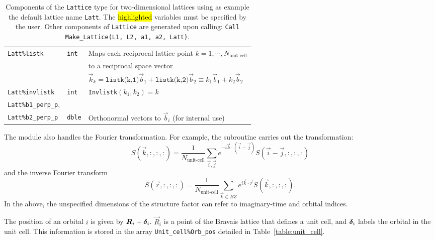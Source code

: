 \begin{table}[h!]
\begin{center}
\begin{tabular}{@{} l l @{$\;\;$} l @{}}
    \texttt{Latt\%listk}                               & \texttt{int}   &  Maps each reciprocal lattice point $k=1,\cdots, N_{\text{unit-cell}}$\\
                                                                   &    & to a reciprocal space vector\\
                                                                   &    & $\vec{k}_k= \texttt{listk(k,1)} \vec{b}_1 +  \texttt{listk(k,2)} \vec{b}_2  \equiv k_1  \vec{b}_1 +   k_2  \vec{b}_2 $ \\
    \texttt{Latt\%invlistk}                            & \texttt{int}   &   \texttt{Invlistk}$(k_1,k_2) = k $ \\
   \texttt{Latt\%b1\_perp\_p},                         &                & \\ 
   \texttt{Latt\%b2\_perp\_p}                          & \texttt{dble}  &  Orthonormal vectors to $\vec{b}_i$ (for internal use) \\\bottomrule
   \end{tabular}
   \caption{Components of the \texttt{Lattice} type for two-dimensional lattices using as example the default lattice name \texttt{Latt}.
   The \hl{highlighted} variables must be specified by the user.  Other components of \texttt{Lattice} are generated upon calling: \texttt{Call Make\_Lattice(L1, L2, a1, a2, Latt)}. 
    \label{table:lattice}}
\end{center}
\end{table}
%

The  module also handles the Fourier transformation.  For example,  the  subroutine     carries out the  transformation: 
\begin{equation}
	S(\vec{k}, :,:,:) =  \frac{1}{N_\text{unit-cell}}  \sum_{\vec{i},\vec{j}}   e^{-i \vec{k} \cdot \left( \vec{i}-\vec{j} \right)} S(\vec{i}  - \vec{j}, :,:,:)
\end{equation}
and    the  inverse Fourier transform 
 \begin{equation}
	S(\vec{r}, :,:,:) =  \frac{1}{N_\text{unit-cell}}  \sum_{\vec{k} \in BZ }   e^{ i \vec{k} \cdot \vec{r}} S(\vec{k}, :,:,:).
\end{equation}
In the above,   the unspecified dimensions of  the structure factor can refer  to imaginary-time  and orbital indices. 

The position of an orbital  $i$  is given by   $\boldsymbol{R}_i +   \boldsymbol{\delta}_i $.   $\vec{R}_i $ is a point of the Bravais lattice that defines a unit cell,  and  $ \boldsymbol{\delta}_i $  labels the orbital in the unit cell. This information is stored in the array
\texttt{Unit\_cell\%Orb\_pos}    detailed in Table~\ref{table:unit_cell}. 


